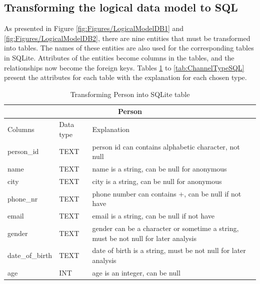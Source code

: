 \subsection{Transforming the logical data model to SQL}
As presented in Figure \ref{fig:Figures/LogicalModelDB1} and \ref{fig:Figures/LogicalModelDB2}, there are nine entities that must be transformed into tables. The names of these entities are also used for the corresponding tables in SQLite. Attributes of the entities become columns in the tables, and the relationships now become the foreign keys.
Tables \ref{tab:PersonTypeSQL} to \ref{tab:ChannelTypeSQL} present the attributes for each table with the explanation for each chosen type.
\begin{table}
\begin{center}
\begin{tabular}{ |p{4cm}|p{1.8cm}|p{6.2cm}|  }
 \hline
 \multicolumn{3}{|c|}{Person} \\
 \hline
 Columns& Data type & Explanation \\
 \hline
 person\_id& TEXT& person id can contains alphabetic character, not null\\
 name& TEXT& name is a string, can be null for anonymous\\
 city& TEXT& city is a string, can be null for anonymous\\
 phone\_nr& TEXT& phone number can contains +, can be null if not have\\
 email& TEXT& email is a string, can be null if not have\\
 gender& TEXT& gender can be a character or sometime a string, must be not null for later analysis\\
 date\_of\_birth& TEXT& date of birth is a string, must be not null for later analysis\\
 age& INT& age is an integer, can be null\\
 \hline
\end{tabular}
\end{center}
\caption{Transforming Person into SQLite table}
\label{tab:PersonTypeSQL}
\end{table}
